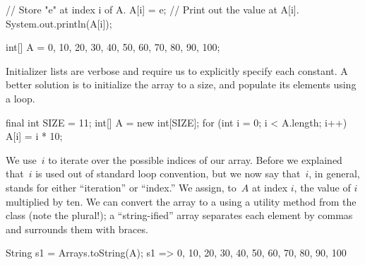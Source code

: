 \begin{verbnobox}[\small]
// Store "e" at index i of A.
A[i] = e;
// Print out the value at A[i].
System.out.println(A[i]);
\end{verbnobox}

\begin{verbnobox}[\small]
int[] A = {0, 10, 20, 30, 40, 50, 60, 70, 80, 90, 100};
\end{verbnobox}

Initializer lists are verbose and require us to explicitly specify each constant. 
A better solution is to initialize the array to a size, and populate its elements using a loop.

\begin{verbnobox}[\small]
final int SIZE = 11;
int[] A = new int[SIZE];
for (int i = 0; i < A.length; i++) { A[i] = i * 10; }
\end{verbnobox}

We use~$i$ to iterate over the possible indices of our array. 
Before we explained that~$i$ is used out of standard loop convention, but we now say that~$i$, in general, stands for either ``iteration'' or ``index.'' 
We assign, to~$A$ at index $i$, the value of $i$ multiplied by ten. 
We can convert the array to a  using a utility method from the  class (note the plural!); a ``string-ified'' array separates each element by commas and surrounds them with braces.

\begin{verbnobox}[\small]
String s1 = Arrays.toString(A);
s1 => {0, 10, 20, 30, 40, 50, 60, 70, 80, 90, 100}
\end{verbnobox}

